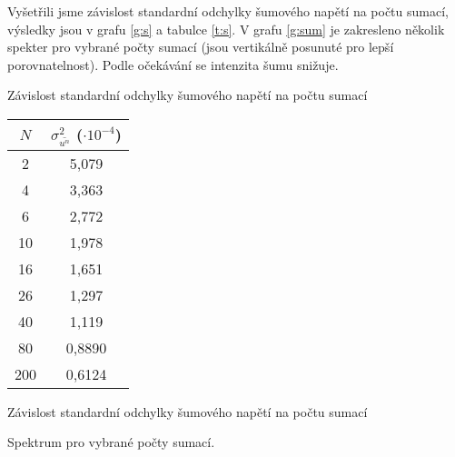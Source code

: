Vyšetřili jsme závislost standardní odchylky šumového napětí na počtu sumací, výsledky jsou v grafu \ref{g:s} a tabulce \ref{t:s}. V grafu \ref{g:sum} je zakresleno několik spekter pro vybrané počty sumací (jsou vertikálně posunuté pro lepší porovnatelnost). Podle očekávání se intenzita šumu snižuje.

\begin{graph}[htbp] 
\centering

\caption{Závislost standardní odchylky šumového napětí na počtu sumací}
\label{g:s}
\end{graph}

\begin{tabulka}[htbp]
\centering
\begin{tabular}{cc}
$N$ & $\sigma^2_{\bar{u^n}}$ ($\cdot 10^{-4}$) \\\hline
2  & 5,079 \\
4 & 3,363 \\
6 & 2,772 \\
10 & 1,978 \\
16 & 1,651 \\
26 & 1,297 \\
40 & 1,119 \\
80 & 0,8890 \\
200 & 0,6124 \\
\end{tabular}
\caption{Závislost standardní odchylky šumového napětí na počtu sumací}
\label{t:s}
\end{tabulka}

\begin{graph}[htbp] 
\centering

\caption{Spektrum pro vybrané počty sumací.}
\label{g:sum}
\end{graph}